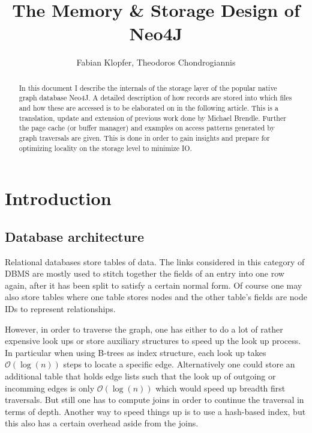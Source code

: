 \documentclass[a4paper,10pt]{article}
\title{The Memory \& Storage Design of Neo4J}
\author{Fabian Klopfer, Theodoros Chondrogiannis}
\begin{document}
\maketitle
\vspace{2cm}

\begin{abstract}
In this document I describe the internals of the storage layer of the popular native graph database Neo4J. 
    A detailed description of how records are stored into which files and how these are accessed is to be elaborated on in the following article.
    This is a translation, update and extension of previous work done by Michael Brendle. 
    Further the page cache (or buffer manager) and examples on access patterns generated by graph traversals are given. 
    This is done in order to gain insights and prepare for optimizing locality on the storage level to minimize IO\@.
\end{abstract} \newpage

\tableofcontents \newpage

\section{Introduction}
    \subsection{Database architecture}
        Relational databases store tables of data.
        The links considered in this category of DBMS are mostly used to stitch together the fields of an entry into one row again, after it has been split to satisfy a certain normal form.
        Of course one may also store tables where one table stores nodes and the other table's fields are node IDs to represent relationships.

        However, in order to traverse the graph, one has either to do a lot of rather expensive look ups or store auxiliary structures to speed up the look up process.
        In particular when using B-trees as index structure, each look up takes $\mathcal{O}(\log(n))$ steps to locate a specific edge.
        Alternatively one could store an additional table that holds edge lists such that the look up of outgoing or incomming edges is only $\mathcal{O}(\log(n))$ which would speed up breadth first traversals.
        But still one has to compute joins in order to continue the traversal in terms of depth.
        Another way to speed things up is to use a hash-based index, but this also has a certain overhead aside from the joins.
\end{document}
